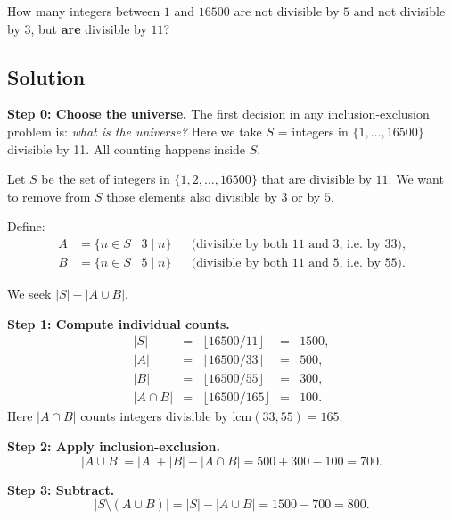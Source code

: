 \documentclass[12pt, a4paper]{article}
\begin{document}
\begin{problembox}
How many integers between $1$ and $16500$ are not divisible by $5$
and not divisible by $3$, but \textbf{are} divisible by $11$?
\end{problembox}

\subsection*{Solution}

\textbf{Step 0: Choose the universe.}\; The first decision in any inclusion-exclusion problem is: \emph{what is the universe?} Here we take $S$ = integers in $\{1, \ldots, 16500\}$ divisible by 11. All counting happens inside $S$.

\medskip
Let $S$ be the set of integers in $\{1, 2, \ldots, 16500\}$ that are
divisible by $11$. We want to remove from $S$ those elements also
divisible by $3$ or by $5$.

Define:
\begin{align*}
  A &= \{n \in S \mid 3 \mid n\}
      &&\text{(divisible by both 11 and 3, i.e.\ by 33)}, \\
  B &= \{n \in S \mid 5 \mid n\}
      &&\text{(divisible by both 11 and 5, i.e.\ by 55)}.
\end{align*}

We seek $|S| - |A \cup B|$.

\textbf{Step 1: Compute individual counts.}
\[
\renewcommand{\arraystretch}{1.3}
\begin{array}{rclcl}
  |S| &=& \lfloor 16500/11 \rfloor &=& 1500, \\
  |A| &=& \lfloor 16500/33 \rfloor &=& 500, \\
  |B| &=& \lfloor 16500/55 \rfloor &=& 300, \\
  |A \cap B| &=& \lfloor 16500/165 \rfloor &=& 100.
\end{array}
\]
Here $|A \cap B|$ counts integers divisible by $\text{lcm}(33,55) = 165$.

\textbf{Step 2: Apply inclusion-exclusion.}
\[
  |A \cup B| = |A| + |B| - |A \cap B| = 500 + 300 - 100 = 700.
\]

\textbf{Step 3: Subtract.}
\[
  |S \setminus (A \cup B)| = |S| - |A \cup B| = 1500 - 700 = 800.
\]
\end{document}
